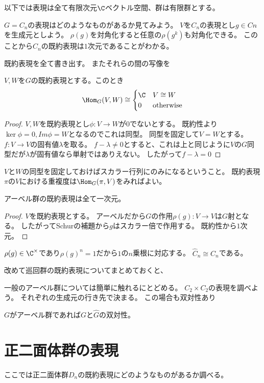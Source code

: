 \documentclass{jsarticle}
\begin{document}
以下では表現は全て有限次元$\C$ベクトル空間、群は有限群とする。

$G=C_n$の表現はどのようなものがあるか見てみよう。
$V$を$C_n$の表現とし$g\in Cn$を生成元としよう。
$\rho(g)$を対角化すると任意の$\rho(g^k)$も対角化できる。
このことから$C_n$の既約表現は$1$次元であることがわかる。

既約表現を全て書き出す。
またそれらの間の写像を

\begin{lem}[Schurの補題]
$V, W$を$G$の既約表現とする。このとき
\[
\Hom_G(V,W)\cong\begin{cases}\C&V\cong W\\0&\mbox{otherwise}\end{cases}
\]
\end{lem}
\begin{proof}
$V, W$を既約表現とし$\phi:V\to W$が$0$でないとする。
既約性より$\ker\phi=0, Im\phi=W$となるのでこれは同型。
同型を固定して$V=W$とする。
$f:V\to V$の固有値$\lambda$を取る。
$f-\lambda\neq0$とすると、これは上と同じように$V$の$G$同型だが$\lambda$が固有値なら単射ではありえない。
したがって$f-\lambda=0$
\end{proof}
$V$と$W$の同型を固定しておけばスカラー行列にのみになるということ。
既約表現$\pi$の$V$における重複度は$\Hom_G(\pi,V)$をみればよい。

\begin{thm}
アーベル群の既約表現は全て一次元。
\end{thm}
\begin{proof}
$V$を既約表現とする。
アーベルだから$G$の作用$\rho(g):V\to V$は$G$射となる。
したがってSchurの補題から$g$はスカラー倍で作用する。
既約性から$1$次元。
\end{proof}

$\rho(g)\in\C^\times$であり$\rho(g)^n=1$だから$1$の$n$乗根に対応する。
$\hat{C}_n\cong C_n$である。

改めて巡回群の既約表現についてまとめておくと、

一般のアーベル群については簡単に触れるにとどめる。
$C_2\times C_2$の表現を調べよう。
それぞれの生成元の行き先で決まる。
この場合も双対性あり

\begin{thm}
$G$がアーベル群であれば$G$と$\hat{G}$の双対性。
\end{thm}

\section{正二面体群の表現}
ここでは正二面体群$D_n$の既約表現にどのようなものがあるか調べる。
\end{document}
